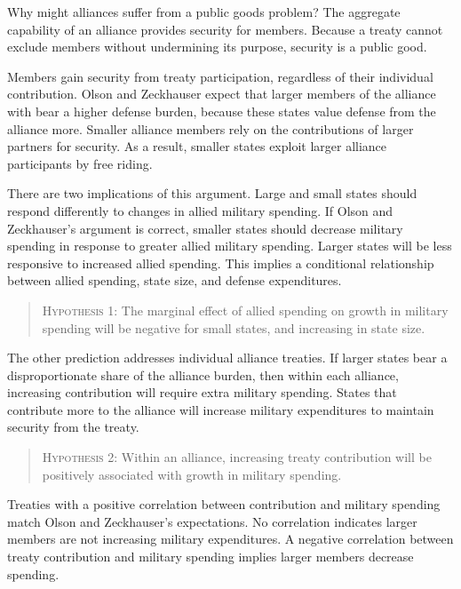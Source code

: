 \documentclass[12pt]{article}
\begin{document}

Why might alliances suffer from a public goods problem? 
The aggregate capability of an alliance provides security for members. 
Because a treaty cannot exclude members without undermining its purpose, security is a public good. 


Members gain security from treaty participation, regardless of their individual contribution. 
Olson and Zeckhauser expect that larger members of the alliance with bear a higher defense burden, because these states value defense from the alliance more. 
Smaller alliance members rely on the contributions of larger partners for security.
As a result, smaller states exploit larger alliance participants by free riding. 


There are two implications of this argument. 
Large and small states should respond differently to changes in allied military spending. 
If Olson and Zeckhauser's argument is correct, smaller states should decrease military spending in response to greater allied military spending. 
Larger states will be less responsive to increased allied spending. 
This implies a conditional relationship between allied spending, state size, and defense expenditures. 


\begin{quote}
\textsc{Hypothesis 1}: The marginal effect of allied spending on growth in military spending will be negative for small states, and increasing in state size. 
\end{quote}


The other prediction addresses individual alliance treaties. 
If larger states bear a disproportionate share of the alliance burden, then within each alliance, increasing contribution will require extra military spending. 
States that contribute more to the alliance will increase military expenditures to maintain security from the treaty. 


\begin{quote}
\textsc{Hypothesis 2}: Within an alliance, increasing treaty contribution will be positively associated with growth in military spending. 
\end{quote}


Treaties with a positive correlation between contribution and military spending match Olson and Zeckhauser's expectations. 
No correlation indicates larger members are not increasing military expenditures.
A negative correlation between treaty contribution and military spending implies larger members decrease spending. 
\end{document}
